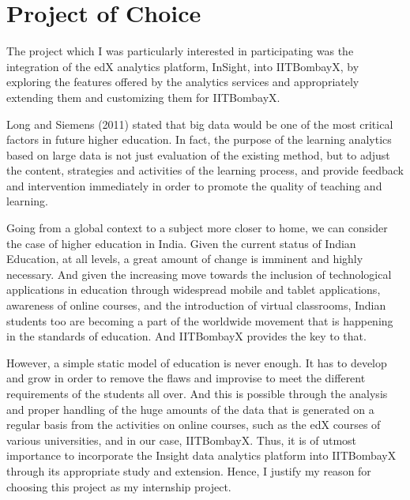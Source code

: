 \documentclass[14pt]{article}
\begin{document}
\section{Project of Choice}
The project which I was particularly interested in participating was the integration of the edX analytics platform, InSight, into IITBombayX, by exploring the features offered by the analytics services and appropriately extending them and customizing them for IITBombayX.

Long and Siemens (2011) \cite{siemens2011penetrating} stated that big data would be one of the most critical factors in future higher education. In fact, the purpose of the learning analytics based on large data is not just evaluation of the existing method, but to adjust the content, strategies and activities of the learning process, and provide feedback and intervention immediately in order to promote the quality of teaching and learning.

Going from a global context to a subject more closer to home, we can consider the case of higher education in India. Given the current status of Indian Education, at all levels, a great amount of change is imminent and highly necessary. And given the increasing move towards the inclusion of technological applications in education through widespread mobile and tablet applications, awareness of online courses, and the introduction of virtual classrooms, Indian students too are becoming a part of the worldwide movement that is happening in the standards of education. And IITBombayX provides the key to that.

However, a simple static model of education is never enough. It has to develop and grow in order to remove the flaws and improvise to meet the different requirements of the students all over. And this is possible through the analysis and proper handling of the huge amounts of the data that is generated on a regular basis from the activities on online courses, such as the edX courses of various universities, and in our case, IITBombayX. Thus, it is of utmost importance to incorporate the Insight data analytics platform into IITBombayX through its appropriate study and extension. Hence, I justify my reason for choosing this project as my internship project.
\end{document}
